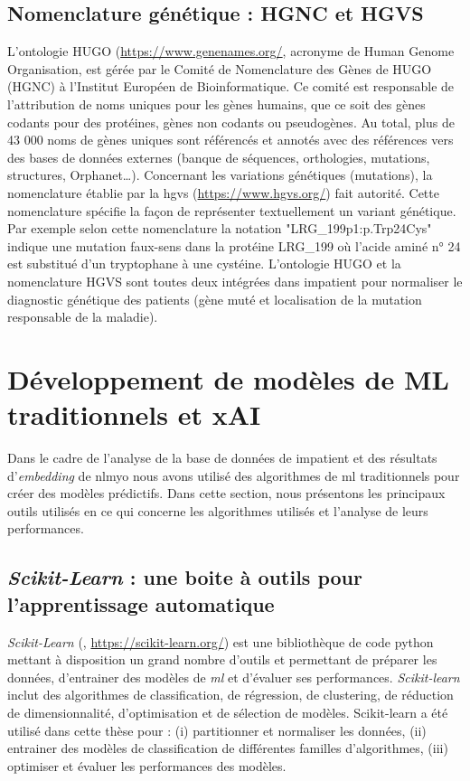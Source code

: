 \subsection{Nomenclature génétique : HGNC et HGVS}
L'ontologie HUGO (\href{https://www.genenames.org/}{https://www.genenames.org/}, acronyme de Human Genome Organisation, est gérée par le Comité de Nomenclature des Gènes de HUGO (HGNC) à l'Institut Européen de Bioinformatique. Ce comité est responsable de l'attribution de noms uniques pour les gènes humains, que ce soit des gènes codants pour des protéines, gènes non codants ou pseudogènes. Au total, plus de 43 000 noms de gènes uniques sont référencés et annotés avec des références vers des bases de données externes (banque de séquences, orthologies, mutations, structures, Orphanet…). Concernant les variations génétiques (mutations), la nomenclature établie par la \gls{hgvs} (\href{https://www.hgvs.org/}{https://www.hgvs.org/}) fait autorité. Cette nomenclature spécifie la façon de représenter textuellement un variant génétique. Par exemple selon cette nomenclature la notation "LRG\_199p1:p.Trp24Cys" indique une mutation faux-sens dans la protéine LRG\_199 où l'acide aminé n° 24 est substitué d'un tryptophane à une cystéine. L'ontologie HUGO et la nomenclature HGVS sont toutes deux intégrées dans \gls{impatient} pour normaliser le diagnostic génétique des patients (gène muté et localisation de la mutation responsable de la maladie).

\section{Développement de modèles de ML traditionnels et xAI}
Dans le cadre de l'analyse de la base de données de \gls{impatient} et des résultats d'\textit{embedding} de \gls{nlmyo} nous avons utilisé des algorithmes de \gls{ml} traditionnels pour créer des modèles prédictifs. Dans cette section, nous présentons les principaux outils utilisés en ce qui concerne les algorithmes utilisés et l'analyse de leurs performances.

\subsection{\textit{Scikit-Learn} : une boite à outils pour l'apprentissage automatique}
\textit{Scikit-Learn} (\cite{pedregosa_scikit-learn_2011}, \href{https://scikit-learn.org/}{https://scikit-learn.org/}) est une bibliothèque de code python mettant à disposition un grand nombre d'outils et permettant de préparer les données, d'entrainer des modèles de \textit{\gls{ml}} et d'évaluer ses performances. \textit{Scikit-learn} inclut des algorithmes de classification, de régression, de clustering, de réduction de dimensionnalité, d'optimisation et de sélection de modèles. Scikit-learn a été utilisé dans cette thèse pour : (i) partitionner et normaliser les données, (ii) entrainer des modèles de classification de différentes familles d'algorithmes, (iii) optimiser et évaluer les performances des modèles.

